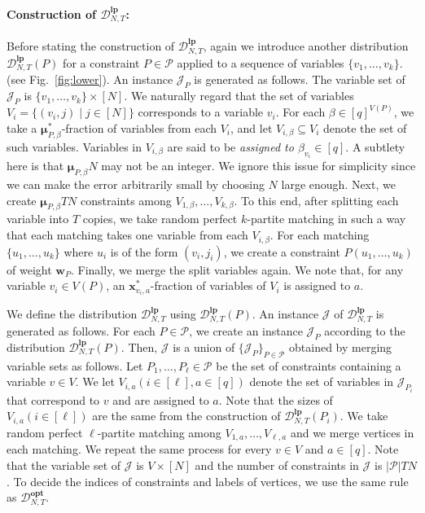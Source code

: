 \documentclass[letterpaper, 11pt]{article}
\newcommand{\calD}{\mathcal{D}}
\newcommand{\calJ}{\mathcal{J}}
\newcommand{\calP}{\mathcal{P}}
\newcommand{\biw}{\boldsymbol{w}}
\newcommand{\bix}{\boldsymbol{x}}
\newcommand{\bimu}{\boldsymbol{\mu}}
\newcommand{\lp}{\mathbf{lp}}
\newcommand{\opt}{\mathbf{opt}}
\begin{document}
\paragraph{Construction of $\calD_{N,T}^{\lp}$:}
Before stating the construction of $\calD_{N,T}^{\lp}$,
again we introduce another distribution $\calD_{N,T}^{\lp}(P)$ for a constraint $P\in \calP$ applied to a sequence of variables $\{v_1,\ldots,v_k\}$. (see Fig.~\ref{fig:lower}).
An instance $\calJ_P$ is generated as follows.
The variable set of $\calJ_P$ is $\{v_1,\ldots,v_k\}\times [N]$.
We naturally regard that the set of variables $V_i = \{(v_i,j) \mid j\in [N]\}$ corresponds to a variable $v_i$.
For each $\beta\in [q]^{V(P)}$,
we take a $\bimu^*_{P,\beta}$-fraction of variables from each $V_i$, and let $V_{i,\beta}\subseteq V_i$ denote the set of such variables.
Variables in $V_{i,\beta}$ are said to be \textit{assigned to $\beta_{v_i} \in [q]$}.
A subtlety here is that $\bimu_{P,\beta}N$ may not be an integer.
We ignore this issue for simplicity since we can make the error arbitrarily small by choosing $N$ large enough.
Next, we create $\bimu_{P,\beta}TN$ constraints among $V_{1,\beta},\ldots,V_{k,\beta}$.
To this end, after splitting each variable into $T$ copies,
we take random perfect $k$-partite matching in such a way that each matching takes one variable from each $V_{i,\beta}$.
For each matching $\{u_1,\ldots,u_k\}$ where $u_i$ is of the form $(v_i,j_i)$,
we create a constraint $P(u_1,\ldots,u_k)$ of weight $\biw_P$.
Finally, we merge the split variables again.
We note that, for any variable $v_i \in V(P)$,
an $\bix^*_{v_i,a}$-fraction of variables of $V_i$ is assigned to $a$.

We define the distribution $\calD_{N,T}^{\lp}$ using $\calD_{N,T}^{\lp}(P)$.
An instance $\calJ$ of $\calD_{N,T}^{\lp}$ is generated as follows.
For each $P\in \calP$,
we create an instance $\calJ_P$ according to the distribution $\calD_{N,T}^{\lp}(P)$.
Then, $\calJ$ is a union of $\{\calJ_P\}_{P\in \calP}$ obtained by merging variable sets as follows.
Let $P_1,\ldots,P_\ell \in \calP$ be the set of constraints containing a variable $v\in V$.
We let $V_{i,a} (i\in [\ell], a\in [q])$ denote the set of variables in $\calJ_{P_i}$ that correspond to $v$ and are assigned to $a$.
Note that the sizes of $V_{i,a} (i\in [\ell])$ are the same from the construction of $\calD_{N,T}^{\lp}(P_i)$.
We take random perfect $\ell$-partite matching among $V_{1,a},\ldots,V_{\ell,a}$ and we merge vertices in each matching.
We repeat the same process for every $v\in V$ and $a\in [q]$.
Note that the variable set of $\calJ$ is $V\times [N]$ and the number of constraints in $\calJ$ is $|\calP|TN$.
To decide the indices of constraints and labels of vertices, we use the same rule as $\calD_{N,T}^{\opt}$.
\end{document}
